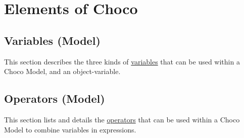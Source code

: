 

%
%
%

\part{Elements of Choco}\label{part:elements}\hypertarget{part:elements}{}
\chapter{Variables (Model)}\label{ch:vars}\hypertarget{ch:vars}{}
This section describes the three kinds of \hyperlink{model:variables}{variables} that can be used within a Choco Model, and an object-variable.




\chapter{Operators (Model)}\label{ch:operators}\hypertarget{ch:operators}{}
This section lists and details the \hyperlink{model:expressionvariables}{operators} that can be used within a Choco Model to combine variables in expressions.







%












%

